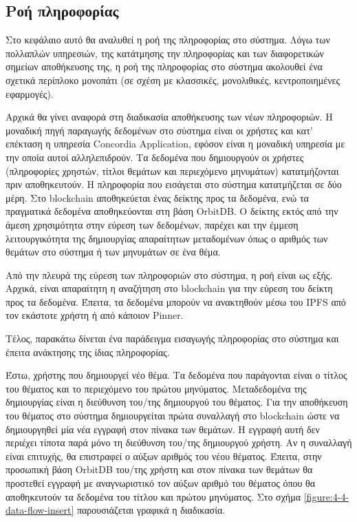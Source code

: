 \subsection{Ροή πληροφορίας} \label{subsection:4-4-data-flow}

Στο κεφάλαιο αυτό θα αναλυθεί η ροή της πληροφορίας στο σύστημα. Λόγω των πολλαπλών υπηρεσιών, της κατάτμησης την πληροφορίας και των διαφορετικών σημείων αποθήκευσης της, η ροή της πληροφορίας στο σύστημα ακολουθεί ένα σχετικά περίπλοκο μονοπάτι (σε σχέση με κλασσικές, μονολιθικές, κεντροποιημένες εφαρμογές).

Αρχικά θα γίνει αναφορά στη διαδικασία αποθήκευσης των νέων πληροφοριών. Η μοναδική πηγή παραγωγής δεδομένων στο σύστημα είναι οι χρήστες και κατ' επέκταση η υπηρεσία Concordia Application, εφόσον είναι η μοναδική υπηρεσία με την οποία αυτοί αλληλεπιδρούν. Τα δεδομένα που δημιουργούν οι χρήστες (πληροφορίες χρηστών, τίτλοι θεμάτων και περιεχόμενο μηνυμάτων) κατατμήζονται πριν αποθηκευτούν. Η πληροφορία που εισάγεται στο σύστημα κατατμήζεται σε δύο μέρη. Στο blockchain αποθηκεύεται ένας δείκτης προς τα δεδομένα, ενώ τα πραγματικά δεδομένα αποθηκεύονται στη βάση OrbitDB. Ο δείκτης εκτός από την άμεση χρησιμότητα στην εύρεση των δεδομένων, παρέχει και την έμμεση λειτουργικότητα της δημιουργίας απαραίτητων μεταδομένων όπως ο αριθμός των θεμάτων στο σύστημα ή των μηνυμάτων σε ένα θέμα.

Από την πλευρά της εύρεση των πληροφοριών στο σύστημα, η ροή είναι ως εξής. Αρχικά, είναι απαραίτητη η αναζήτηση στο blockchain για την εύρεση του δείκτη προς τα δεδομένα. Έπειτα, τα δεδομένα μπορούν να ανακτηθούν μέσω του IPFS από τον εκάστοτε χρήστη ή από κάποιον Pinner.

Τέλος, παρακάτω δίνεται ένα παράδειγμα εισαγωγής πληροφορίας στο σύστημα και έπειτα ανάκτησης της ίδιας πληροφορίας.

Έστω, χρήστης που δημιουργεί νέο θέμα. Τα δεδομένα που παράγονται είναι ο τίτλος του θέματος και το περιεχόμενο του πρώτου μηνύματος. Μεταδεδομένα της δημιουργίας είναι η διεύθυνση του/της δημιουργού του θέματος. Για την αποθήκευση του θέματος στο σύστημα δημιουργείται πρώτα συναλλαγή στο blockchain ώστε να δημιουργηθεί μία νέα εγγραφή στον πίνακα των θεμάτων. Η εγγραφή αυτή δεν περιέχει τίποτα παρά μόνο τη διεύθυνση του/της δημιουργού χρήστη. Αν η συναλλαγή είναι επιτυχής, θα επιστραφεί ο αύξων αριθμός του νέου θέματος. Έπειτα, στην προσωπική βάση OrbitDB του/της χρήστη και στον πίνακα των θεμάτων θα προστεθεί εγγραφή με αναγνωριστικό τον αύξων αριθμό του θέματος όπου θα αποθηκευτούν τα δεδομένα του τίτλου και πρώτου μηνύματος. Στο σχήμα \ref{figure:4-4-data-flow-insert} παρουσιάζεται γραφικά η διαδικασία.

